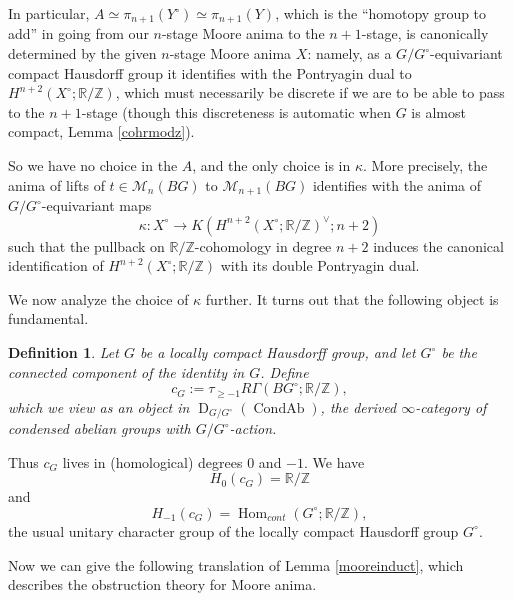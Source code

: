 \documentclass[12pt]{article}
\newtheorem{definition}[theorem]{Definition}
\theoremstyle{definition}
\newcommand{\on}{\operatorname}
\newcommand{\mc}{\mathcal}
\newcommand{\mbb}{\mathbb}
\begin{document}
In particular, $A\simeq \pi_{n+1}(Y^\circ)\simeq \pi_{n+1}(Y)$, which is the ``homotopy group to add'' in going from our $n$-stage Moore anima to the $n+1$-stage, is canonically determined by the given $n$-stage Moore anima $X$: namely, as a $G/G^\circ$-equivariant compact Hausdorff group it identifies with the Pontryagin dual to $H^{n+2}(X^\circ;\mbb{R}/\mbb{Z})$, which must necessarily be discrete if we are to be able to pass to the $n+1$-stage (though this discreteness is automatic when $G$ is almost compact, Lemma \ref{cohrmodz}).

So we have no choice in the $A$, and the only choice is in $\kappa$.  More precisely, the anima of lifts of $t\in\mc{M}_{n}(BG)$ to $\mc{M}_{n+1}(BG)$ identifies with the anima of $G/G^\circ$-equivariant maps
$$\kappa: X^\circ \to K(H^{n+2}(X^\circ;\mbb{R}/\mbb{Z})^\vee;n+2)$$
such that the pullback on $\mbb{R}/\mbb{Z}$-cohomology in degree $n+2$ induces the canonical identification of $H^{n+2}(X^\circ;\mbb{R}/\mbb{Z})$ with its double Pontryagin dual.


We now analyze the choice of $\kappa$ further.  It turns out that the following object is fundamental.

\begin{definition}
Let $G$ be a locally compact Hausdorff group, and let $G^\circ$ be the connected component of the identity in $G$.  Define
$$c_G := \tau_{\geq -1} R\Gamma(BG^\circ;\mbb{R}/\mbb{Z}),$$
which we view as an object in $\on{D}_{G/G^\circ}(\on{CondAb})$, the derived $\infty$-category of condensed abelian groups with $G/G^\circ$-action.
\end{definition}

Thus $c_G$ lives in (homological) degrees $0$ and $-1$. We have
$$H_0(c_G) = \mbb{R}/\mbb{Z}$$
and
$$H_{-1}(c_G) = \on{Hom}_{cont}(G^\circ;\mbb{R}/\mbb{Z}),$$
the usual unitary character group of the locally compact Hausdorff group $G^\circ$.

Now we can give the following translation of Lemma \ref{mooreinduct}, which describes the obstruction theory for Moore anima.
\end{document}
